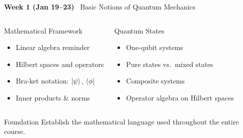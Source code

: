 \documentclass[aspectratio=169,10pt]{beamer}
\newcommand{\week}[1]{\textcolor{blue!60!black}{\textbf{#1}}}
\begin{document}
\begin{frame}{\week{Week 1 (Jan 19--23)} \ Basic Notions of Quantum Mechanics}
  \begin{columns}[T]
      \begin{block}{Mathematical Framework}
        \begin{itemize}
          \item Linear algebra reminder
          \item Hilbert spaces and operators
          \item Bra-ket notation: $\ket{\psi}$, $\bra{\phi}$
          \item Inner products \& norms
        \end{itemize}
      \end{block}
      \begin{block}{Quantum States}
        \begin{itemize}
          \item One-qubit systems
          \item Pure states vs.\ mixed states
          \item Composite systems
          \item Operator algebra on Hilbert spaces
        \end{itemize}
      \end{block}
  \end{columns}
  \vspace{8pt}
  \begin{alertblock}{Foundation}
    Establish the mathematical language used throughout
    the entire course.
  \end{alertblock}
\end{frame}
\end{document}
